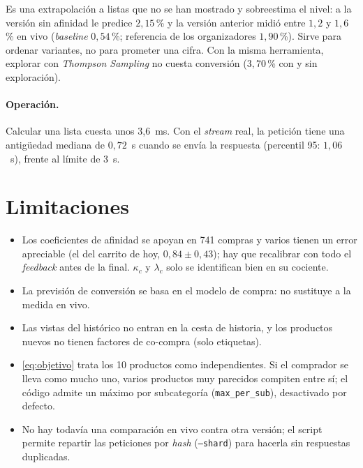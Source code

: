 \documentclass[11pt,a4paper]{article}
\newcommand{\cod}[1]{\texttt{#1}}
\begin{document}
Es una extrapolación a listas que no se han mostrado y sobreestima el nivel: a la versión sin afinidad le
predice $2{,}15$\,\% y la versión anterior midió entre $1{,}2$ y $1{,}6$\,\% en vivo (\emph{baseline}
$0{,}54$\,\%; referencia de los organizadores $1{,}90$\,\%). Sirve para ordenar variantes, no para prometer
una cifra. Con la misma herramienta, explorar con \emph{Thompson Sampling} no cuesta conversión
($3{,}70$\,\% con y sin exploración).

\paragraph{Operación.} Calcular una lista cuesta unos 3{,}6~ms. Con el \emph{stream} real, la petición tiene
una antigüedad mediana de $0{,}72$~s cuando se envía la respuesta (percentil 95: $1{,}06$~s), frente al
límite de 3~s.

\section{Limitaciones}

\begin{itemize}\setlength{\itemsep}{0.15em}
\item Los coeficientes de afinidad se apoyan en 741 compras y varios tienen un error apreciable (el del
carrito de hoy, $0{,}84\pm0{,}43$); hay que recalibrar con todo el \emph{feedback} antes de la final.
$\kappa_c$ y $\lambda_c$ solo se identifican bien en su cociente.
\item La previsión de conversión se basa en el modelo de compra: no sustituye a la medida en vivo.
\item Las vistas del histórico no entran en la cesta de historia, y los productos nuevos no tienen
factores de co-compra (solo etiquetas).
\item \eqref{eq:objetivo} trata los 10 productos como independientes. Si el comprador se lleva como
mucho uno, varios productos muy parecidos compiten entre sí; el código admite un máximo por
subcategoría (\cod{max\_per\_sub}), desactivado por defecto.
\item No hay todavía una comparación en vivo contra otra versión; el script permite repartir las
peticiones por \emph{hash} (\cod{--shard}) para hacerla sin respuestas duplicadas.
\end{itemize}
\end{document}
